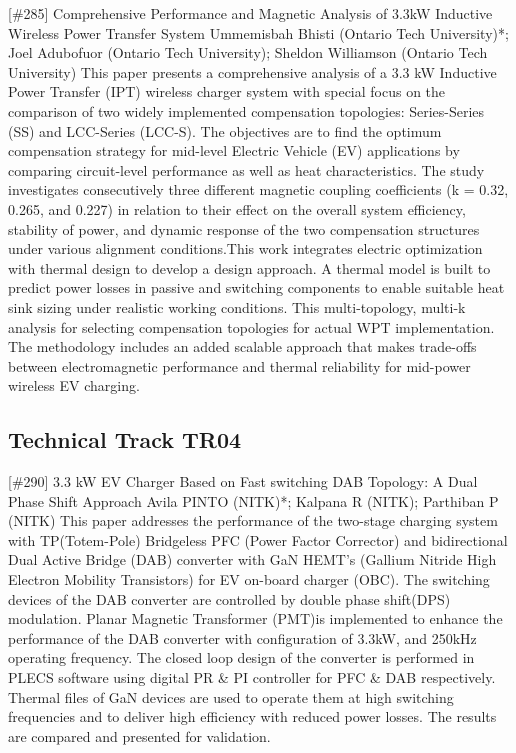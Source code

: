 {} \begin{abstract_online} {[\#285] Comprehensive Performance and Magnetic Analysis of 3.3kW Inductive Wireless Power Transfer System} {} {Ummemisbah  Bhisti (Ontario Tech University)*; Joel Adubofuor (Ontario Tech University); Sheldon Williamson (Ontario Tech University)} {} This paper presents a comprehensive analysis of a 3.3 kW Inductive Power Transfer (IPT) wireless charger system with special focus on the comparison of two widely implemented compensation topologies: Series-Series (SS) and LCC-Series (LCC-S). The objectives are to find the optimum compensation strategy for mid-level Electric Vehicle (EV) applications by comparing circuit-level performance as well as heat characteristics. The study investigates consecutively three different magnetic coupling coefficients (k = 0.32, 0.265, and 0.227) in relation to their effect on the overall system efficiency, stability of power, and dynamic response of the two compensation structures under various alignment conditions.This work integrates electric optimization with thermal design to develop a design approach. A thermal model is built to predict power losses in passive and switching components to enable suitable heat sink sizing under realistic working conditions. This multi-topology, multi-k analysis for selecting compensation topologies for actual WPT implementation. The methodology includes an added scalable approach that makes trade-offs between electromagnetic performance and thermal reliability for mid-power wireless EV charging. \end{abstract_online} 
\clearpage \subsection{Technical Track TR04}\nopagebreak {} \begin{abstract_online} {[\#290] 3.3 kW EV Charger Based on Fast switching DAB Topology: A Dual Phase Shift Approach} {} {Avila PINTO (NITK)*; Kalpana R (NITK); Parthiban P (NITK)} {} This paper addresses the performance of the two-stage charging system with TP(Totem-Pole) Bridgeless PFC (Power Factor Corrector) and bidirectional Dual Active Bridge (DAB) converter with GaN HEMT's (Gallium Nitride High Electron Mobility Transistors) for EV on-board charger (OBC). The switching devices of the DAB converter are controlled by double  phase shift(DPS) modulation. Planar Magnetic Transformer (PMT)is implemented to enhance the performance of the DAB converter with configuration of 3.3kW, and 250kHz operating frequency. The closed loop design of the converter is performed in PLECS software using digital PR \& PI controller for PFC \& DAB respectively. Thermal files of GaN devices are used to operate them at high switching frequencies and to deliver high efficiency with reduced power losses. The results are compared and presented for validation. \end{abstract_online} 
